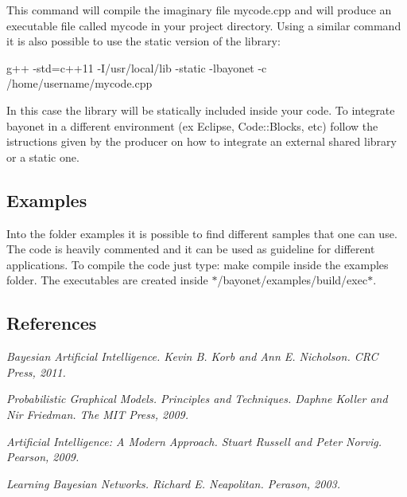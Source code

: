 This command will compile the imaginary file mycode.\-cpp and will produce an executable file called mycode in your project directory. Using a similar command it is also possible to use the static version of the library\-:

{\ttfamily g++ -\/std=c++11 -\/\-I/usr/local/lib -\/static -\/lbayonet -\/c /home/username/mycode.cpp}

In this case the library will be statically included inside your code. To integrate bayonet in a different environment (ex Eclipse, Code\-::\-Blocks, etc) follow the istructions given by the producer on how to integrate an external shared library or a static one.

\subsection*{Examples }

Into the folder {\ttfamily examples} it is possible to find different samples that one can use. The code is heavily commented and it can be used as guideline for different applications. To compile the code just type\-: {\ttfamily make compile} inside the {\ttfamily examples} folder. The executables are created inside $\ast$/bayonet/examples/build/exec$\ast$.

\subsection*{References }


\begin{DoxyItemize}
\item {\itshape Bayesian Artificial Intelligence. Kevin B. Korb and Ann E. Nicholson. C\-R\-C Press, 2011.}
\item {\itshape Probabilistic Graphical Models. Principles and Techniques. Daphne Koller and Nir Friedman. The M\-I\-T Press, 2009.}
\item {\itshape Artificial Intelligence\-: A Modern Approach. Stuart Russell and Peter Norvig. Pearson, 2009.}
\item {\itshape Learning Bayesian Networks. Richard E. Neapolitan. Perason, 2003.} 
\end{DoxyItemize}